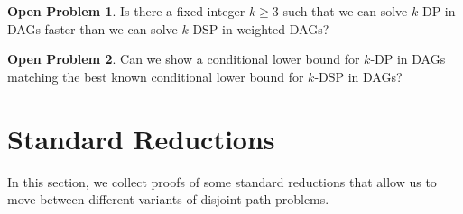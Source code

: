 \documentclass[11pt]{article}
\theoremstyle{definition}
\newtheorem{open}{Open Problem}
\begin{document}
\begin{open}
Is there a fixed integer $k\ge 3$  such that we can solve \textsf{$k$-DP} in DAGs faster than we can solve \textsf{$k$-DSP} in weighted DAGs? 
\end{open}

\begin{open}
    Can we show a conditional lower bound for \textsf{$k$-DP} in DAGs matching the best known conditional lower bound for \textsf{$k$-DSP} in DAGs? 
\end{open}

\newpage




\newpage


\appendix 


\section{Standard Reductions}
\label{app:unnecessary}

In this section, we collect proofs of some standard reductions that allow us to move between different variants of disjoint path problems.
\end{document}
